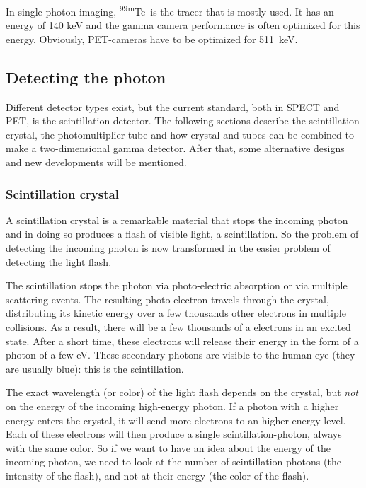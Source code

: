 \documentclass[11pt,oneside]{article}
\begin{document}
In single photon imaging, \textsuperscript{99m}Tc\ is the tracer that is mostly used. It has
an energy of 140 keV and the gamma camera performance is often optimized for
this energy.  Obviously, PET-cameras have to be optimized for 511~keV.

\subsection{Detecting the photon}
Different detector types exist, but the current standard, both in SPECT and
PET, is the scintillation detector. The following sections describe the
scintillation crystal, the photomultiplier tube and how crystal and tubes
can be combined to make a two-dimensional gamma detector. After that, some
alternative designs and new developments will be mentioned.

\subsubsection{Scintillation crystal}
A scintillation crystal is a remarkable material that stops the incoming
photon and in doing so produces a flash of visible light, a scintillation.
So the problem of detecting the incoming photon is now transformed in the
easier problem of detecting the light flash.

The scintillation stops the photon via photo-electric absorption or via
multiple scattering events. The resulting photo-electron travels through the
crystal, distributing its kinetic energy over a few thousands other electrons
in multiple collisions. As a result, there will be a few thousands of a
electrons in an excited state. After a short time, these electrons will
release their energy in the form of a photon of a few eV. These secondary
photons are visible to the human eye (they are usually blue): this is the
scintillation.

The exact wavelength (or color) of the light flash depends on the crystal,
but {\em not} on the energy of the incoming high-energy photon. If a photon
with a higher energy enters the crystal, it will send more electrons to an
higher energy level. Each of these electrons will then produce a single
scintillation-photon, always with the same color. So if we want to have an
idea about the energy of the incoming photon, we need to look at the number
of scintillation photons (the intensity of the flash), and not at their
energy (the color of the flash).
\end{document}
